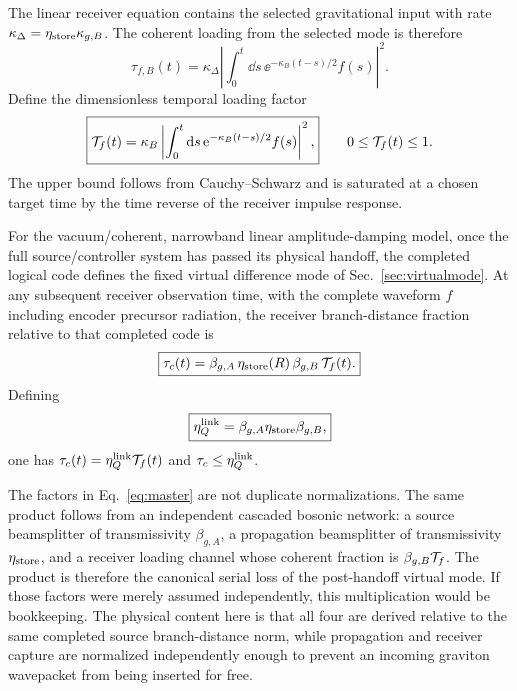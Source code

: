 The linear receiver equation contains the selected gravitational input with rate $\kappa_\Delta=\eta_{\rm store}\kappa_{g,B}$. The coherent loading from the selected mode is therefore
\begin{equation}
\tau_{f,B}(t)
=\kappa_\Delta
\left|
\int_0^t\dd s\,
\ee^{-\kappa_B(t-s)/2}f(s)
\right|^2.
\end{equation}
Define the dimensionless temporal loading factor
\begin{equation}
\boxed{
\mathcal T_f(t)
=\kappa_B
\left|
\int_0^t\mathrm{d} s\,
\mathrm{e}^{-\kappa_B(t-s)/2}f(s)
\right|^2,}
\qquad
0\le\mathcal T_f(t)\le1.
\label{eq:Tf}
\end{equation}
The upper bound follows from Cauchy--Schwarz and is saturated at a chosen target time by the time reverse of the receiver impulse response.

\begin{proposition}
For the vacuum/coherent, narrowband linear amplitude-damping model, once the full source/controller system has passed its physical handoff, the completed logical code defines the fixed virtual difference mode of Sec.~\ref{sec:virtualmode}. At any subsequent receiver observation time, with the complete waveform $f$ including encoder precursor radiation, the receiver branch-distance fraction relative to that completed code is
\begin{equation}
\boxed{
\tau_c(t)=
\beta_{g,A}\,
\eta_{\rm store}(R)\,
\beta_{g,B}\,
\mathcal T_f(t).}
\label{eq:master}
\end{equation}
Defining
\begin{equation}
\boxed{\eta_Q^{\rm link}=\beta_{g,A}\eta_{\rm store}\beta_{g,B},}
\label{eq:etalink}
\end{equation}
one has $\tau_c(t)=\eta_Q^{\rm link}\mathcal T_f(t)$ and $\tau_c\le\eta_Q^{\rm link}$.
\end{proposition}

The factors in Eq.~\eqref{eq:master} are not duplicate normalizations. The same product follows from an independent cascaded bosonic network: a source beamsplitter of transmissivity $\beta_{g,A}$, a propagation beamsplitter of transmissivity $\eta_{\rm store}$, and a receiver loading channel whose coherent fraction is $\beta_{g,B}\mathcal T_f$. The product is therefore the canonical serial loss of the post-handoff virtual mode. If those factors were merely assumed independently, this multiplication would be bookkeeping. The physical content here is that all four are derived relative to the same completed source branch-distance norm, while propagation and receiver capture are normalized independently enough to prevent an incoming graviton wavepacket from being inserted for free.

